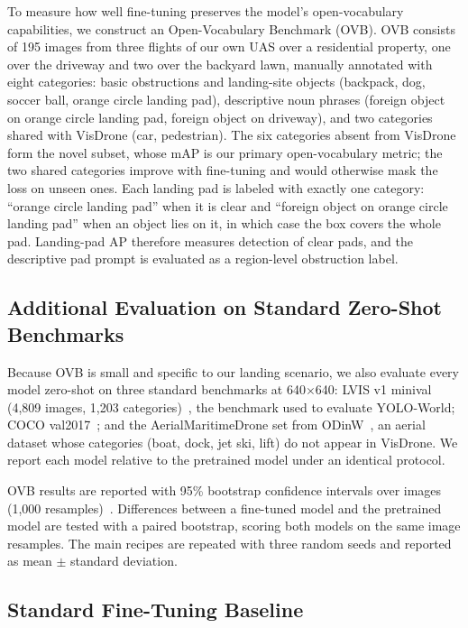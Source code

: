 \documentclass[conf]{new-aiaa}
\begin{document}
To measure how well fine-tuning preserves the model's open-vocabulary capabilities, we
construct an Open-Vocabulary Benchmark (OVB). OVB consists of 195 images from three flights of
our own UAS over a residential property, one over the driveway and two over the backyard lawn,
manually annotated with eight categories: basic
obstructions and landing-site objects (backpack, dog, soccer ball, orange circle landing pad),
descriptive noun phrases (foreign object on orange circle landing pad, foreign object on
driveway), and two categories shared with VisDrone (car, pedestrian). The six categories absent
from VisDrone form the novel subset, whose mAP is our primary open-vocabulary metric; the two
shared categories improve with fine-tuning and would otherwise mask the loss on unseen ones.
Each landing pad is labeled with exactly one category: ``orange circle landing pad'' when it is
clear and ``foreign object on orange circle landing pad'' when an object lies on it, in which
case the box covers the whole pad. Landing-pad AP therefore measures detection of clear pads,
and the descriptive pad prompt is evaluated as a region-level obstruction label.

\subsection{Additional Evaluation on Standard Zero-Shot Benchmarks}

Because OVB is small and specific to our landing scenario, we also evaluate every model
zero-shot on three standard benchmarks at 640$\times$640: LVIS v1 minival (4,809 images,
1,203 categories)~\cite{gupta2019lvis}, the benchmark used to evaluate YOLO-World; COCO
val2017~\cite{lin2014coco}; and the AerialMaritimeDrone set from ODinW~\cite{li2022glip},
an aerial dataset whose categories (boat, dock, jet ski, lift) do not appear in VisDrone. We report
each model relative to the pretrained model under an identical protocol.

OVB results are reported with 95\% bootstrap confidence intervals over images (1,000
resamples)~\cite{efron1994bootstrap}. Differences between a fine-tuned model and the
pretrained model are tested with a paired bootstrap, scoring both models on the same image
resamples. The main recipes are repeated with three random seeds and reported as mean
$\pm$ standard deviation.



\subsection{Standard Fine-Tuning Baseline}
\end{document}
